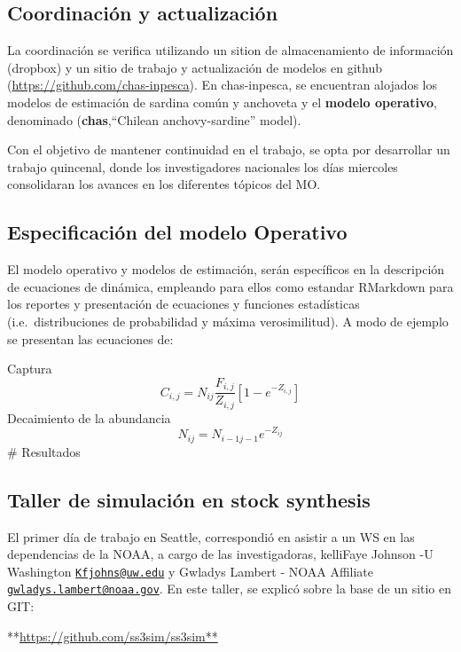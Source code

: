 \documentclass[]{article}
\begin{document}
\subsection{Coordinación y
actualización}\label{coordinacion-y-actualizacion}

La coordinación se verifica utilizando un sition de almacenamiento de
información (dropbox) y un sitio de trabajo y actualización de modelos
en github (\url{https://github.com/chas-inpesca}). En chas-inpesca, se
encuentran alojados los modelos de estimación de sardina común y
anchoveta y el \textbf{modelo operativo}, denominado
(\textbf{chas},``Chilean anchovy-sardine'' model).

Con el objetivo de mantener continuidad en el trabajo, se opta por
desarrollar un trabajo quincenal, donde los investigadores nacionales
los días miercoles consolidaran los avances en los diferentes tópicos
del MO.

\subsection{Especificación del modelo
Operativo}\label{especificacion-del-modelo-operativo}

El modelo operativo y modelos de estimación, serán específicos en la
descripción de ecuaciones de dinámica, empleando para ellos como
estandar RMarkdown para los reportes y presentación de ecuaciones y
funciones estadísticas (i.e.~distribuciones de probabilidad y máxima
verosimilitud). A modo de ejemplo se presentan las ecuaciones de:

Captura \[
C_{i,j} =N_{ij}\frac{F_{i,j}}{Z_{i,j}}[1-e^{-Z_{i,j}}]
\] Decaimiento de la abundancia \[
N_{ij}= N_{i-1j-1}e^{-Z_{ij}}
\] \# Resultados

\subsection{Taller de simulación en stock
synthesis}\label{taller-de-simulacion-en-stock-synthesis}

El primer día de trabajo en Seattle, correspondió en asistir a un WS en
las dependencias de la NOAA, a cargo de las investigadoras, kelliFaye
Johnson -U Washington
\href{mailto:Kfjohns@uw.edu}{\nolinkurl{Kfjohns@uw.edu}} y Gwladys
Lambert - NOAA Affiliate
\href{mailto:gwladys.lambert@noaa.gov}{\nolinkurl{gwladys.lambert@noaa.gov}}.
En este taller, se explicó sobre la base de un sitio en GIT:

**\url{https://github.com/ss3sim/ss3sim**}
\end{document}
